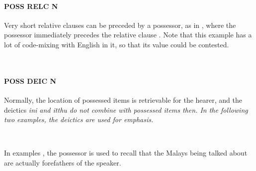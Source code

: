 \paragraph{POSS RELC    N}
Very short relative clauses can be preceded by a possessor, as in , where the possessor  immediately precedes the relative clause . Note that this example has a lot of code-mixing with English in it, so that its value could be contested.

 \\

\paragraph{POSS DEIC N}
Normally, the location of possessed items is retrievable for the hearer, and the deictics \em ini \em and \em itthu \em do not combine with possessed items then. In the following two examples, the deictics are used for emphasis.

 \\

In examples , the possessor is used to recall that the Malays being talked about are actually forefathers of the speaker.

